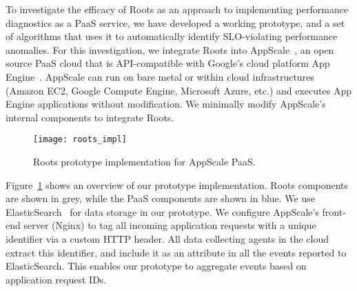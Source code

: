 To investigate the efficacy of Roots as an approach to
implementing performance diagnostics as a PaaS service, we have developed a
working prototype, and a set of algorithms that uses it to automatically
identify SLO-violating performance anomalies.
For this investigation, we integrate Roots into AppScale~\cite{6488671}, an open source PaaS cloud
that is API-compatible with Google's cloud platform App Engine~\cite{gae}.  
AppScale can run on bare metal or within cloud infrastructures (Amazon EC2, Google Compute Engine, 
 Microsoft Azure, etc.) and executes App Engine applications without modification.
We minimally modify AppScale's internal components to integrate Roots.


\begin{figure}
\centering
\texttt{[image: roots\_impl]}
\caption{Roots prototype implementation for AppScale PaaS.}
\label{fig:roots_impl}
\end{figure}

Figure~\ref{fig:roots_impl} shows an overview of our prototype implementation. Roots components
are shown in grey, while the PaaS components are shown in blue.
We use ElasticSearch~\cite{Kononenko:2014:MMR:2597073.2597091} for data storage in our prototype. 
We configure AppScale's front-end server (Nginx) to tag all incoming application requests
with a unique identifier via a custom HTTP header. 
All data collecting agents in the cloud extract this identifier, and include it as an attribute
in all the events reported to ElasticSearch. This enables our prototype to aggregate events based 
on application request IDs.

